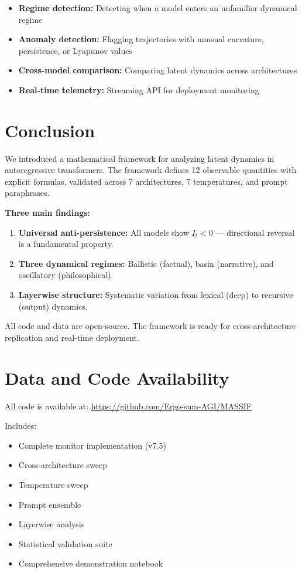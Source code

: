 \documentclass[12pt,a4paper]{article}
\begin{document}
\begin{itemize}[noitemsep]
    \item \textbf{Regime detection:} Detecting when a model enters an unfamiliar dynamical regime
    \item \textbf{Anomaly detection:} Flagging trajectories with unusual curvature, persistence, or Lyapunov values
    \item \textbf{Cross-model comparison:} Comparing latent dynamics across architectures
    \item \textbf{Real-time telemetry:} Streaming API for deployment monitoring
\end{itemize}

\section{Conclusion}

We introduced a mathematical framework for analyzing latent dynamics in autoregressive transformers. The framework defines 12 observable quantities with explicit formulas, validated across 7 architectures, 7 temperatures, and prompt paraphrases.

\textbf{Three main findings:}

\begin{enumerate}[noitemsep]
    \item \textbf{Universal anti-persistence:} All models show $I_t < 0$ — directional reversal is a fundamental property.
    \item \textbf{Three dynamical regimes:} Ballistic (factual), basin (narrative), and oscillatory (philosophical).
    \item \textbf{Layerwise structure:} Systematic variation from lexical (deep) to recursive (output) dynamics.
\end{enumerate}

All code and data are open-source. The framework is ready for cross-architecture replication and real-time deployment.

\section{Data and Code Availability}

All code is available at: \url{https://github.com/Ergo-sum-AGI/MASSIF}

Includes:
\begin{itemize}[noitemsep]
    \item Complete monitor implementation (v7.5)
    \item Cross-architecture sweep
    \item Temperature sweep
    \item Prompt ensemble
    \item Layerwise analysis
    \item Statistical validation suite
    \item Comprehensive demonstration notebook
\end{itemize}
\end{document}
